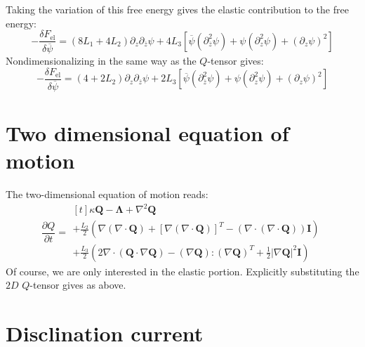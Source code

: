 \documentclass[reqno]{article}
\begin{document}
Taking the variation of this free energy gives the elastic contribution to the free energy:
\begin{equation}
    - \frac{\delta F_\text{el}}{\delta \overline{\psi}}
    =
    \left(8 L_1 + 4 L_2 \right) \partial_z \partial_{\overline{z}} \psi
    + 4 L_3 \left[
        \overline{\psi} \left( \partial_{\overline{z}}^2 \psi \right)
        + \psi \left( \partial_z^2 \psi \right)
        + \left( \partial_z \psi \right)^2
    \right]
\end{equation}
Nondimensionalizing in the same way as the $Q$-tensor gives:
\begin{equation}
    - \frac{\delta F_\text{el}}{\delta \overline{\psi}}
    =
    \left(4 + 2 L_2 \right) \partial_z \partial_{\overline{z}} \psi
    + 2 L_3 \left[
        \overline{\psi} \left( \partial_{\overline{z}}^2 \psi \right)
        + \psi \left( \partial_z^2 \psi \right)
        + \left( \partial_z \psi \right)^2
    \right]
\end{equation}

\section{Two dimensional equation of motion}

The two-dimensional equation of motion reads:
\begin{equation}
    \frac{\partial Q}{\partial t}
    =
    \begin{multlined}[t]
      \kappa \mathbf{Q}
      - \boldsymbol{\Lambda}
      + \nabla^2 \mathbf{Q}  \\
      + \frac{L_2}{2} \left(
        \nabla \left( \nabla \cdot \mathbf{Q} \right)
        + \left[ \nabla \left( \nabla \cdot \mathbf{Q} \right) \right]^T
        - \left( \nabla \cdot \left( \nabla \cdot \mathbf{Q} \right) \right) \mathbf{I}
      \right) \\
      + \frac{L_3}{2} \left(
        2 \nabla \cdot \left( \mathbf{Q} \cdot \nabla \mathbf{Q} \right)
        - \left( \nabla \mathbf{Q} \right) : \left( \nabla \mathbf{Q} \right)^T
        + \tfrac12 \left| \nabla \mathbf{Q} \right|^2 \mathbf{I}
      \right)
    \end{multlined}
\end{equation}
Of course, we are only interested in the elastic portion.
Explicitly substituting the $2D$ $Q$-tensor gives as above.

\section{Disclination current}
\end{document}
